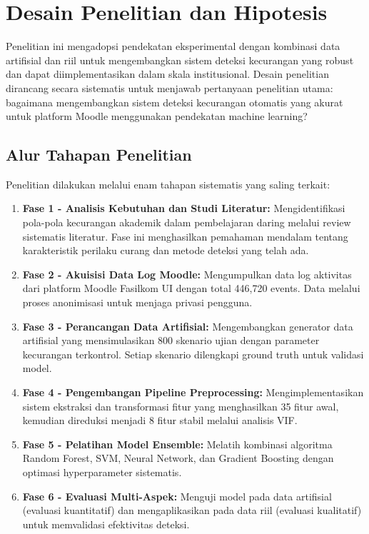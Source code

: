 \section{Desain Penelitian dan Hipotesis}
\label{sec:desainPenelitian}
Penelitian ini mengadopsi pendekatan eksperimental dengan kombinasi data artifisial dan riil untuk mengembangkan sistem deteksi kecurangan yang robust dan dapat diimplementasikan dalam skala institusional. Desain penelitian dirancang secara sistematis untuk menjawab pertanyaan penelitian utama: bagaimana mengembangkan sistem deteksi kecurangan otomatis yang akurat untuk platform Moodle menggunakan pendekatan machine learning?

\subsection{Alur Tahapan Penelitian}
\label{subsec:alurTahapanPenelitian}
Penelitian dilakukan melalui enam tahapan sistematis yang saling terkait:

\begin{enumerate}
    \item \textbf{Fase 1 - Analisis Kebutuhan dan Studi Literatur:} Mengidentifikasi pola-pola kecurangan akademik dalam pembelajaran daring melalui review sistematis literatur. Fase ini menghasilkan pemahaman mendalam tentang karakteristik perilaku curang dan metode deteksi yang telah ada.
    
    \item \textbf{Fase 2 - Akuisisi Data Log Moodle:} Mengumpulkan data log aktivitas dari platform Moodle Fasilkom UI dengan total 446,720 events. Data melalui proses anonimisasi untuk menjaga privasi pengguna.
    
    \item \textbf{Fase 3 - Perancangan Data Artifisial:} Mengembangkan generator data artifisial yang mensimulasikan 800 skenario ujian dengan parameter kecurangan terkontrol. Setiap skenario dilengkapi ground truth untuk validasi model.
    
    \item \textbf{Fase 4 - Pengembangan Pipeline Preprocessing:} Mengimplementasikan sistem ekstraksi dan transformasi fitur yang menghasilkan 35 fitur awal, kemudian direduksi menjadi 8 fitur stabil melalui analisis VIF.
    
    \item \textbf{Fase 5 - Pelatihan Model Ensemble:} Melatih kombinasi algoritma Random Forest, SVM, Neural Network, dan Gradient Boosting dengan optimasi hyperparameter sistematis.
    
    \item \textbf{Fase 6 - Evaluasi Multi-Aspek:} Menguji model pada data artifisial (evaluasi kuantitatif) dan mengaplikasikan pada data riil (evaluasi kualitatif) untuk memvalidasi efektivitas deteksi.
\end{enumerate}

